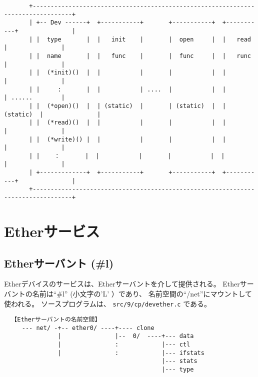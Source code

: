 {\small
\begin{verbatim}    
       +---------------------------------------------------------------------------------+ 
       | +-- Dev ------+  +-----------+       +-----------+  +-----------+               | 
       | |  type       |  |   init    |       |  open     |  |   read    |               |
       | |  name       |  |   func    |       |  func     |  |   runc    |               |
       | |  (*init)()  |  |           |       |           |  |           |               |
       | |     :       |  |           | ....  |           |  |           | ......        |
       | |  (*open)()  |  | (static)  |       | (static)  |  | (static)  |               |
       | |  (*read)()  |  |           |       |           |  |           |               |
       | |  (*write)() |  |           |       |           |  |           |               |
       | |    ：       |  |           |       |           |  |           |               |
       | +-------------+  +-----------+       +-----------+  +-----------+               | 
       +---------------------------------------------------------------------------------+ 

\end{verbatim}
}    



\chapter{ Etherサービス}

\section{Etherサーバント (\#l)}

    Etherデバイスのサービスは、Etherサーバントを介して提供される。
    Etherサーバントの名前は``\#l'' (小文字の'L' ）であり、
   名前空間の``/net''にマウントして使われる。
   ソースプログラムは、 {\tt src/9/cp/devether.c} である。

\begin{verbatim}   
  【Etherサーバントの名前空間】
     --- net/ -+-- ether0/ ----+---- clone                    
               |               |--  0/  ----+--- data        
               |               :            |--- ctl       
               |               :            |--- ifstats   
                                            |--- stats     
                                            |--- type      
                                                            
\end{verbatim}    
    

